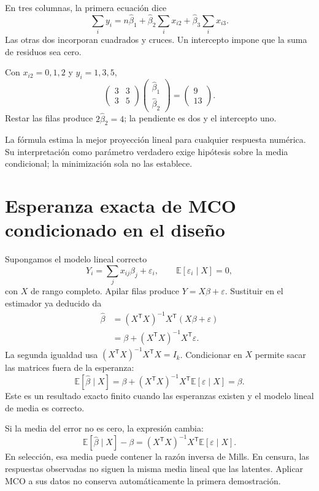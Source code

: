 \documentclass[11pt,a4paper]{article}
\newcommand{\E}{\mathbb E}
\newcommand{\T}{^{\mathsf T}}
\begin{document}
En tres columnas, la primera ecuación dice
\[
\sum_i y_i=n\widehat\beta_1
+\widehat\beta_2\sum_i x_{i2}
+\widehat\beta_3\sum_i x_{i3}.
\]
Las otras dos incorporan cuadrados y cruces.
Un intercepto impone que la suma de residuos sea cero.

\begin{ejemplo}
Con \(x_{i2}=0,1,2\) y \(y_i=1,3,5\),
\[
\begin{pmatrix}3&3\\3&5\end{pmatrix}
\begin{pmatrix}\widehat\beta_1\\\widehat\beta_2\end{pmatrix}
=\begin{pmatrix}9\\13\end{pmatrix}.
\]
Restar las filas produce \(2\widehat\beta_2=4\);
la pendiente es dos y el intercepto uno.
\end{ejemplo}
La fórmula estima la mejor proyección lineal
para cualquier respuesta numérica.
Su interpretación como parámetro verdadero
exige hipótesis sobre la media condicional;
la minimización sola no las establece.

\clearpage
\section{Esperanza exacta de MCO condicionado en el diseño}\label{unidad9}
Supongamos el modelo lineal correcto
\[
Y_i=\sum_jx_{ij}\beta_j+\varepsilon_i,\qquad
\E[\varepsilon_i\mid X]=0,
\]
con \(X\) de rango completo.
Apilar filas produce \(Y=X\beta+\varepsilon\).
Sustituir en el estimador ya deducido da
\[
\begin{aligned}
\widehat\beta
&=(X\T X)^{-1}X\T(X\beta+\varepsilon)\\
&=\beta+(X\T X)^{-1}X\T\varepsilon.
\end{aligned}
\]
La segunda igualdad usa
\((X\T X)^{-1}X\T X=I_k\).
Condicionar en \(X\) permite sacar las matrices
fuera de la esperanza:
\[
\E[\widehat\beta\mid X]
=\beta+(X\T X)^{-1}X\T\E[\varepsilon\mid X]
=\beta.
\]
Este es un resultado exacto finito cuando las
esperanzas existen y el modelo lineal de media es correcto.

Si la media del error no es cero, la expresión cambia:
\[
\E[\widehat\beta\mid X]-\beta
=(X\T X)^{-1}X\T\E[\varepsilon\mid X].
\]
En selección, esa media puede contener la
razón inversa de Mills.
En censura, las respuestas observadas no siguen
la misma media lineal que las latentes.
Aplicar MCO a sus datos no conserva automáticamente
la primera demostración.
\end{document}
